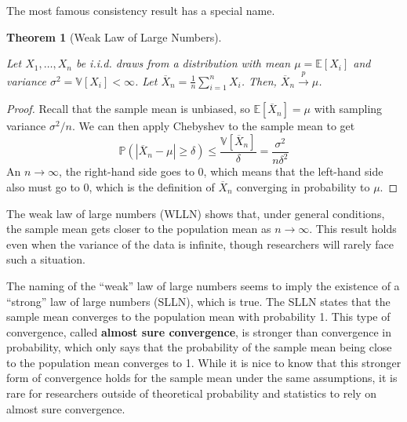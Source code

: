 \documentclass[
  13pt,
  letterpaper,
  DIV=11,
  numbers=noendperiod]{scrreprt}
\newcommand{\E}{\mathbb{E}}
\newcommand{\V}{\mathbb{V}}
\renewcommand{\P}{\mathbb{P}}
\newcommand{\Xbar}{\overline{X}}
\newcommand{\inprob}{\overset{p}{\to}}
\theoremstyle{definition}
\theoremstyle{definition}
\theoremstyle{plain}
\newtheorem{theorem}{Theorem}[chapter]
\theoremstyle{remark}
\begin{document}
The most famous consistency result has a special name.

\begin{theorem}[Weak Law of Large
Numbers]\protect\hypertarget{thm-lln}{}\label{thm-lln}

Let \(X_1, \ldots, X_n\) be i.i.d. draws from a distribution with mean
\(\mu = \E[X_i]\) and variance \(\sigma^2 = \V[X_i] < \infty\). Let
\(\Xbar_n = \frac{1}{n} \sum_{i =1}^n X_i\). Then,
\(\Xbar_n \inprob \mu\).

\end{theorem}

\begin{proof}
Recall that the sample mean is unbiased, so \(\E[\Xbar_n] = \mu\) with
sampling variance \(\sigma^2/n\). We can then apply Chebyshev to the
sample mean to get \[
\P(|\Xbar_n - \mu| \geq \delta) \leq \frac{\V[\Xbar_n]}{\delta} = \frac{\sigma^2}{n\delta^2}
\] An \(n\rightarrow\infty\), the right-hand side goes to 0, which means
that the left-hand side also must go to 0, which is the definition of
\(\Xbar_n\) converging in probability to \(\mu\).
\end{proof}

The weak law of large numbers (WLLN) shows that, under general
conditions, the sample mean gets closer to the population mean as
\(n\rightarrow\infty\). This result holds even when the variance of the
data is infinite, though researchers will rarely face such a situation.

\begin{tcolorbox}[enhanced jigsaw, leftrule=.75mm, colbacktitle=quarto-callout-note-color!10!white, title=\textcolor{quarto-callout-note-color}{\faInfo}\hspace{0.5em}{Note}, toptitle=1mm, breakable, left=2mm, toprule=.15mm, arc=.35mm, opacitybacktitle=0.6, opacityback=0, colback=white, rightrule=.15mm, titlerule=0mm, colframe=quarto-callout-note-color-frame, bottomtitle=1mm, bottomrule=.15mm, coltitle=black]

The naming of the ``weak'' law of large numbers seems to imply the
existence of a ``strong'' law of large numbers (SLLN), which is true.
The SLLN states that the sample mean converges to the population mean
with probability 1. This type of convergence, called \textbf{almost sure
convergence}, is stronger than convergence in probability, which only
says that the probability of the sample mean being close to the
population mean converges to 1. While it is nice to know that this
stronger form of convergence holds for the sample mean under the same
assumptions, it is rare for researchers outside of theoretical
probability and statistics to rely on almost sure convergence.

\end{tcolorbox}
\end{document}
